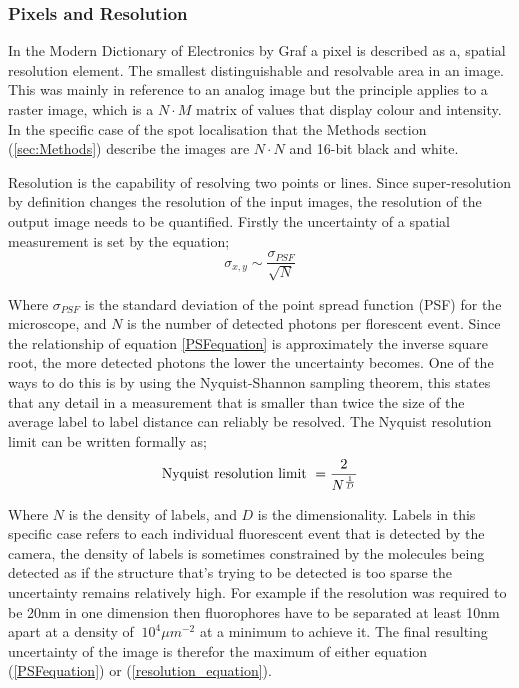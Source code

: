 \documentclass[aps,pra,a4paper,nofootinbib,onecolumn,tightenlines,longbibliography,12pt,amsfonts,amssymb,amsmath,floatfix]{revtex4-2} %
\begin{document}
  \subsubsection{Pixels and Resolution} %
  \label{ssub:Pixel}
   In the Modern Dictionary of Electronics by Graf a pixel is described as a, 
   spatial resolution element.
   The smallest distinguishable and resolvable area in an image.
   \cite{graf1997modern}
   This was mainly in reference to an analog image but the principle applies 
   to a raster image, which is a $N\cdot M$ matrix of values that display colour and
   intensity. In the specific case of the spot localisation that the Methods section 
   (\ref{sec:Methods}) describe the images are $N\cdot N$ and 16-bit black and white.

   Resolution is the capability of resolving two points or lines.
   Since super-resolution by definition changes the resolution of the input images, 
   the resolution of the output image needs to be quantified.
   Firstly the uncertainty of a spatial measurement is set by the equation;
   \begin{equation}\label{PSFequation}
   \sigma_{x,y}\sim\frac{\sigma_{PSF}}{\sqrt{N}}
   \end{equation}

   Where $\sigma_{PSF}$ is the standard deviation of the point spread function (PSF)
   for the microscope, and $N$ is the number of detected photons per florescent event.
   Since the relationship of equation \ref{PSFequation} is approximately the inverse square root, 
   the more detected photons the lower the uncertainty becomes.\cite{DEMPSEY2013561}
   One of the ways to do this is by using the Nyquist-Shannon sampling theorem,
   this states that any detail in a measurement that is smaller than twice the size of the 
   average label to label distance can reliably be resolved.\cite{tinnefeld2015far}
   The Nyquist resolution limit can be written formally as; 
   \begin{equation}\label{resolution_equation}
     \textrm{Nyquist resolution limit} \/\ =\frac{2}{N^{\frac{1}{D}}}
   \end{equation}

   Where $N$ is the density of labels, and $D$ is the dimensionality. 
   Labels in this specific case refers to each individual fluorescent event that is 
   detected by the camera, the density of labels is sometimes constrained by the 
   molecules being detected as if the structure that's trying to be detected is too
   sparse the uncertainty remains relatively high. 
   For example if the resolution was required to be 20nm in 
   one dimension then fluorophores have to be separated at least 10nm apart at a density of 
   $~10^4\mu m^{-2}$ at a minimum to achieve it.
   The final resulting uncertainty of the image is therefor the maximum of either equation (\ref{PSFequation}) or (\ref{resolution_equation}). 
\end{document}
